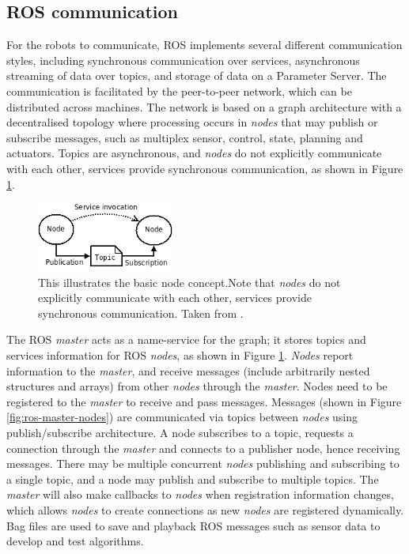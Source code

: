 \subsection{ROS communication}

For the robots to communicate, ROS implements several different communication styles, including synchronous communication over services, asynchronous streaming of data over topics, and storage of data on a Parameter Server. The communication is facilitated by the peer-to-peer network, which can be distributed across machines. The network is based on a graph architecture with a decentralised topology where processing occurs in \textit{nodes} that may publish or subscribe messages, such as multiplex sensor, control, state, planning and actuators. Topics are asynchronous, and \textit{nodes} do not explicitly communicate with each other, services provide synchronous communication, as shown in Figure \ref{fig:ros-basic-concept}.

\begin{figure}[H]
    \centering
    \includegraphics[width=0.4\textwidth]{figs/implementation/ROS_basic_concepts.png}
    \caption{This illustrates the basic node concept.Note that \textit{nodes} do not explicitly communicate with each other, services provide synchronous communication. Taken from \cite{Quigley2009}.}
    \label{fig:ros-basic-concept} 
\end{figure}

The ROS \textit{master} acts as a name-service for the graph; it stores topics and services information for ROS \textit{nodes}, as shown in Figure \ref{fig:ros-basic-concept}. \textit{Nodes} report information to the \textit{master}, and receive messages (include arbitrarily nested structures and arrays) from other \textit{nodes} through the \textit{master}. Nodes need to be registered to the \textit{master} to receive and pass messages. Messages (shown in Figure \ref{fig:ros-master-nodes}) are communicated via topics between \textit{nodes} using publish/subscribe architecture. A node subscribes to a topic, requests a connection through the \textit{master} and connects to a publisher node, hence receiving messages. There may be multiple concurrent \textit{nodes} publishing and subscribing to a single topic, and a node may publish and subscribe to multiple topics. The \textit{master} will also make callbacks to \textit{nodes} when registration information changes, which allows \textit{nodes} to create connections as new \textit{nodes} are registered dynamically. Bag files are used to save and playback ROS messages such as sensor data to develop and test algorithms.


